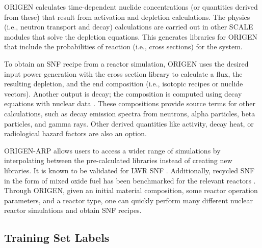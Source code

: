 \gls{ORIGEN} calculates time-dependent nuclide concentrations (or quantities
derived from these) that result from activation and depletion calculations. The
physics (i.e., neutron transport and decay) calculations are carried out in
other \gls{SCALE} modules that solve the depletion equations.  This generates
libraries for \gls{ORIGEN} that include the probabilities of reaction (i.e.,
cross sections) for the system.

To obtain an \gls{SNF} recipe from a reactor simulation, \gls{ORIGEN} uses the
desired input power generation with the cross section library to calculate a
flux, the resulting depletion, and the end composition (i.e., isotopic recipes
or nuclide vectors).  Another output is decay; the composition is computed
using decay equations with nuclear data \cite{endf}. These compositions provide
source terms for other calculations, such as decay emission spectra from
neutrons, alpha particles, beta particles, and gamma rays. Other derived
quantities like activity, decay heat, or radiological hazard factors are also
an option.

\gls{ORIGEN-ARP} allows users to access a wider range of simulations by
interpolating between the pre-calculated libraries instead of creating new
libraries.  It is known to be validated for \gls{LWR} \gls{SNF}
\cite{lwr_valid}. Additionally, recycled \gls{SNF} in the form of mixed oxide
fuel has been benchmarked for the relevant reactors \cite{mox_valid}.  Through
\gls{ORIGEN}, given an initial material composition, some reactor operation
parameters, and a reactor type, one can quickly perform many different nuclear
reactor simulations and obtain \gls{SNF} recipes.


\subsection{Training Set Labels}
\label{sec:snflbls}

